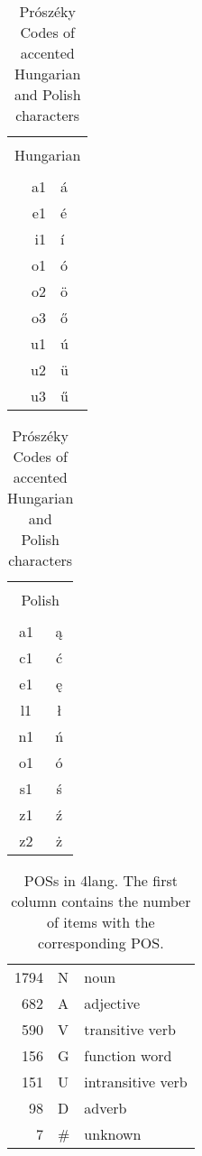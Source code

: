 \documentclass[a4paper,10pt]{article}
\begin{document}
\begin{table}[h]
\begin{center}
\begin{tabular}{rl}
\toprule 
\\\multicolumn{2}{c}{Hungarian}
\\\midrule
\\ a1 & á
\\ e1 & é
\\ i1 & í
\\ o1 & ó
\\ o2 & ö
\\ o3 & ő
\\ u1 & ú
\\ u2 & ü
\\ u3 & ű
\\\bottomrule
\end{tabular}
\begin{tabular}{cc}
\toprule
\\\multicolumn{2}{c}{Polish}
\\\midrule
\\ a1	& ą
\\ c1	& ć
\\ e1	& ę
\\ l1	& ł
\\ n1	& ń
\\ o1	& ó
\\ s1	& ś
\\ z1	& ź
\\ z2	& ż
\\\bottomrule
\end{tabular}
\end{center}
\caption{Prószéky Codes of accented Hungarian and Polish characters}
\label{table_proszeky}
\end{table}
\begin{table}[h]
\begin{center}
\begin{tabular}{rll}
\toprule 
1794	& N & noun
\\ 682	& A & adjective
\\ 590	& V & transitive verb
\\ 156	& G & function word
\\ 151	& U & intransitive verb
\\ 98	& D & adverb
\\ 7	& \# & unknown
\\\bottomrule
\end{tabular}
\end{center}
\caption{POSs in 4lang. The first column contains the number of items with the corresponding POS.}
\label{table_pos}
\end{table}
\end{document}
